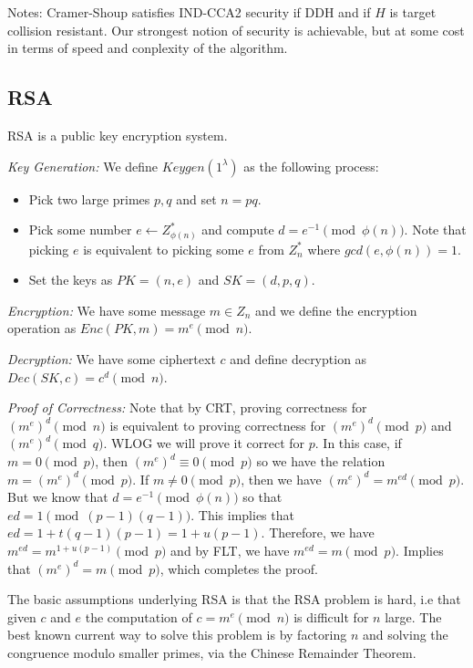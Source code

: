 \documentclass[psamsfonts]{amsart}
\begin{document}
Notes: Cramer-Shoup satisfies IND-CCA2 security if DDH and if $H$ is target collision resistant. Our strongest notion of security is achievable, but at some cost in terms of speed and conplexity of the algorithm.

\subsection{RSA}

RSA is a public key encryption system.

\emph{Key Generation:} We define $Keygen(1^\lambda)$ as the following process:
\begin{itemize}
  \item Pick two large primes $p,q$ and set $n = pq$.
  \item Pick some number $e \leftarrow Z_{\phi(n)}^*$ and compute $d = e^{-1} \pmod{\phi(n)}$. Note that picking $e$ is equivalent to picking some $e$ from $Z_n^*$ where $gcd(e, \phi(n)) = 1$.
  \item Set the keys as $PK = (n, e)$ and $SK = (d, p, q)$.
\end{itemize}

\emph{Encryption:} We have some message $m \in Z_n$ and we define the encryption operation as $Enc(PK, m) = m^e \pmod{n}$.

\emph{Decryption:} We have some ciphertext $c$ and define decryption as $Dec(SK, c) = c^d \pmod{n}$.

\emph{Proof of Correctness:} Note that by CRT, proving correctness for $(m^e)^d \pmod{n}$ is equivalent to proving correctness for $(m^e)^d \pmod{p}$ and $(m^e)^d \pmod{q}$. WLOG we will prove it correct for $p$. In this case, if $m = 0 \pmod{p}$, then $(m^e)^d \equiv 0 \pmod{p}$ so we have the relation $m = (m^e)^d \pmod{p}$. If $m \neq 0 \pmod{p}$, then we have $(m^e)^d = m^{ed} \pmod{p}$. But we know that $d = e^{-1} \pmod{\phi(n)}$ so that $ed = 1 \pmod{(p-1)(q-1)}$. This implies that $ed = 1 + t(q-1)(p-1) = 1 + u(p-1)$. Therefore, we have $m^{ed} = m^{1+u(p-1)} \pmod{p}$ and by FLT, we have $m^{ed} = m \pmod{p}$. Implies that $(m^e)^d = m \pmod{p}$, which completes the proof.

The basic assumptions underlying RSA is that the RSA problem is hard, i.e that given $c$ and $e$ the computation of $c = m^e \pmod{n}$ is difficult for $n$ large. The best known current way to solve this problem is by factoring $n$ and solving the congruence modulo smaller primes, via the Chinese Remainder Theorem.
\end{document}
